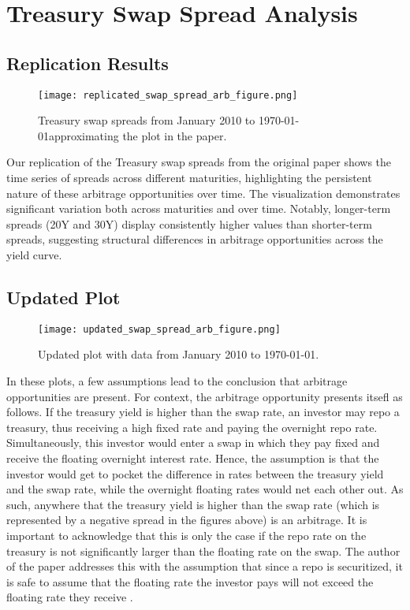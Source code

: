 \documentclass[12pt]{article}
\begin{document}
\section{Treasury Swap Spread Analysis}

\subsection{Replication Results}

\begin{figure}[H]
    \centering
    \texttt{[image: replicated\_swap\_spread\_arb\_figure.png]}
    \caption{Treasury swap spreads from January 2010 to \today approximating the plot in the paper.}
    \label{fig:treasury_swap_spreads_replicated}
\end{figure}

Our replication of the Treasury swap spreads from the original paper shows the time series of spreads across different maturities, highlighting the persistent nature of these arbitrage opportunities over time. The visualization demonstrates significant variation both across maturities and over time. Notably, longer-term spreads (20Y and 30Y) display consistently higher values than shorter-term spreads, suggesting structural differences in arbitrage opportunities across the yield curve. 

\subsection{Updated Plot}
\begin{figure}[H]
    \centering
    \texttt{[image: updated\_swap\_spread\_arb\_figure.png]}
    \caption{Updated plot with data from January 2010 to \today.}
    \label{fig:treasury_swap_spreads_updated}
\end{figure}

In these plots, a few assumptions lead to the conclusion that arbitrage opportunities are present. For context, the arbitrage opportunity presents itsefl as follows. If the treasury yield is higher than the swap rate, an investor may repo a treasury, thus receiving a high fixed rate and paying the overnight repo rate. Simultaneously, this investor would enter a swap in which they pay fixed and receive the floating overnight interest rate. Hence, the assumption is that the investor would get to pocket the difference in rates between the treasury yield and the swap rate, while the overnight floating rates would net each other out. As such, anywhere that the treasury yield is higher than the swap rate (which is represented by a negative spread in the figures above) is an arbitrage. It is important to acknowledge that this is only the case if the repo rate on the treasury is not significantly larger than the floating rate on the swap. The author of the paper addresses this with the assumption that since a repo is securitized, it is safe to assume that the floating rate the investor pays will not exceed the floating rate they receive \citet{NBERw30561}.
\end{document}

